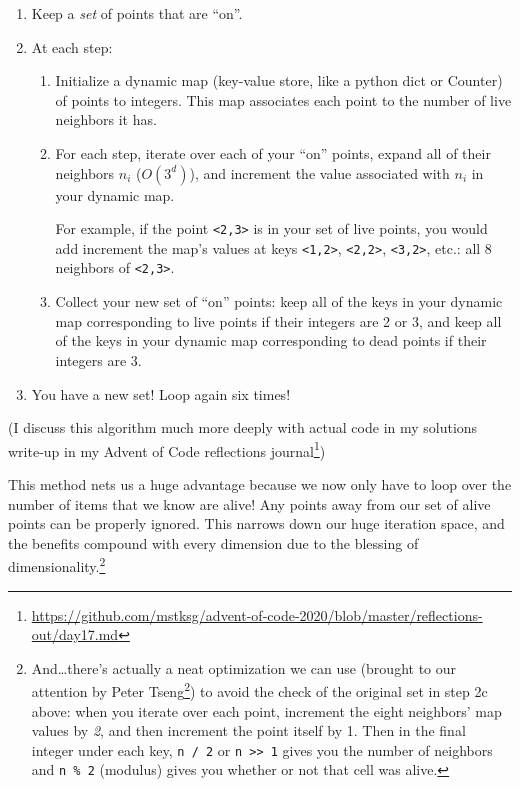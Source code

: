 \documentclass[]{article}
\renewcommand{\href}[2]{#2\footnote{\url{#1}}}
\begin{document}
\begin{enumerate}
\def\labelenumi{\arabic{enumi}.}
\tightlist
\item
  Keep a \emph{set} of points that are ``on''.
\item
  At each step:

  \begin{enumerate}
  \def\labelenumii{\alph{enumii}.}
  \item
    Initialize a dynamic map (key-value store, like a python dict or Counter) of
    points to integers. This map associates each point to the number of live
    neighbors it has.
  \item
    For each step, iterate over each of your ``on'' points, expand all of their
    neighbors \(n_i\) (\(O(3^d)\)), and increment the value associated with
    \(n_i\) in your dynamic map.

    For example, if the point \texttt{\textless{}2,3\textgreater{}} is in your
    set of live points, you would add increment the map's values at keys
    \texttt{\textless{}1,2\textgreater{}},
    \texttt{\textless{}2,2\textgreater{}},
    \texttt{\textless{}3,2\textgreater{}}, etc.: all 8 neighbors of
    \texttt{\textless{}2,3\textgreater{}}.
  \item
    Collect your new set of ``on'' points: keep all of the keys in your dynamic
    map corresponding to live points if their integers are 2 or 3, and keep all
    of the keys in your dynamic map corresponding to dead points if their
    integers are 3.
  \end{enumerate}
\item
  You have a new set! Loop again six times!
\end{enumerate}

(I discuss this algorithm much more deeply with actual code in
\href{https://github.com/mstksg/advent-of-code-2020/blob/master/reflections-out/day17.md}{my
solutions write-up in my Advent of Code reflections journal})

This method nets us a huge advantage because we now only have to loop over the
number of items that we know are alive! Any points away from our set of alive
points can be properly ignored. This narrows down our huge iteration space, and
the benefits compound with every dimension due to the blessing of
dimensionality.\footnote{And\ldots there's actually a neat optimization we can
  use (brought to our attention by
  \href{https://www.reddit.com/r/adventofcode/comments/kfb6zx/day_17_getting_to_t6_at_for_higher_spoilerss/ghmllf8}{Peter
  Tseng}) to avoid the check of the original set in step 2c above: when you
  iterate over each point, increment the eight neighbors' map values by
  \emph{2}, and then increment the point itself by 1. Then in the final integer
  under each key, \texttt{n\ /\ 2} or
  \texttt{n\ \textgreater{}\textgreater{}\ 1} gives you the number of neighbors
  and \texttt{n\ \%\ 2} (modulus) gives you whether or not that cell was alive.}
\end{document}
